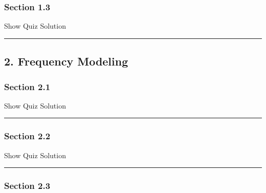 \documentclass[]{article}
\begin{document}
\subsubsection{Section 1.3}\label{section-1.3}

\hypertarget{surveyElement13}{}

\hypertarget{surveyResult13}{}

Show Quiz Solution

\hypertarget{display.Quiz13.2}{}
\begin{center}\rule{0.5\linewidth}{\linethickness}\end{center}

\subsection{2. Frequency Modeling}\label{frequency-modeling}

\subsubsection{Section 2.1}\label{section-2.1}

\hypertarget{surveyElement21}{}

\hypertarget{surveyResult21}{}

Show Quiz Solution

\hypertarget{display.Quiz21.2}{}
\begin{center}\rule{0.5\linewidth}{\linethickness}\end{center}

\subsubsection{Section 2.2}\label{section-2.2}

\hypertarget{surveyElement22}{}

\hypertarget{surveyResult22}{}

Show Quiz Solution

\hypertarget{display.Quiz22.2}{}
\begin{center}\rule{0.5\linewidth}{\linethickness}\end{center}

\subsubsection{Section 2.3}\label{section-2.3}

\hypertarget{surveyElement23}{}

\hypertarget{surveyResult23}{}
\end{document}
